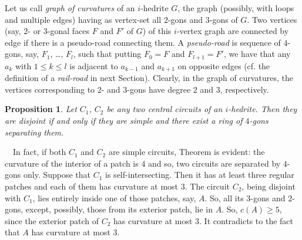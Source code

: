 \documentclass[12pt]{article}
\newtheorem{proposition}{Proposition}
\newcommand{\proof}{\noindent{\bf Proof.}\ \ }
\begin{document}
Let us call {\em graph of curvatures} of an $i$-hedrite $G$, the
graph (possibly, with loops and multiple edges) having as vertex-set
all $2$-gons and $3$-gons of $G$. 
Two vertices (say, $2$- or $3$-gonal faces $F$ and $F'$ of $G$) of 
this $i$-vertex graph are connected by edge if there is a pseudo-road 
connecting them. A {\em pseudo-road} is sequence of $4$-gons, say,
$F_1$, \dots, $F_l$, such that putting $F_0=F$ and $F_{l+1}=F'$, 
we have that any $a_k$ with $1\leq k\leq l$ is adjacent to $a_{k-1}$ 
and $a_{k+1}$ on opposite edges (cf. the definition of
a {\em rail-road} in next Section). Clearly, in the graph of curvatures, 
the vertices corresponding to $2$- and $3$-gons have degree $2$ and $3$, 
respectively.




\begin{proposition}\label{intersec}
Let $C_1$, $C_2$ be any two central circuits of an $i$-hedrite. Then 
they are disjoint if and only if they are simple and there exist a 
ring of $4$-gons separating them.

\end{proposition}
\proof In fact, if both $C_1$ and $C_2$ are simple circuits, Theorem 
is evident: the curvature of the interior of a patch is $4$ and so, two
circuits are separated by $4$-gons only. Suppose that $C_1$ is 
self-intersecting. Then it has at least three regular patches and each 
of them has curvature at most $3$.
The circuit $C_2$, being disjoint with $C_1$, lies entirely inside one 
of those patches, say, $A$. So, all its $3$-gons and $2$-gons, except, 
possibly, those from its exterior patch, lie in $A$. So, $c(A)\geq 5$,
since the exterior patch of $C_2$ has curvature at most $3$.
It contradicts to the fact that $A$ has curvature at most $3$. 
\end{document}
